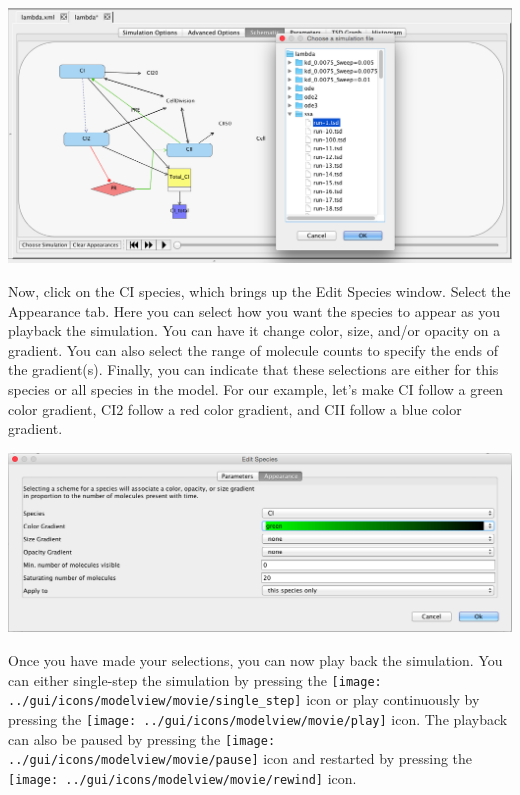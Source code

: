 \documentclass[titlepage,11pt]{article}
\begin{document}
\begin{center}
\includegraphics[width=160mm]{screenshots/chooseSim}
\end{center}

Now, click on the CI species, which brings up the Edit Species window.  Select the Appearance tab.  Here you can select how you want the species to appear as you playback the simulation.  You can have it change color, size, and/or opacity on a gradient.  You can also select the range of molecule counts to specify the ends of the gradient(s).  Finally, you can indicate that these selections are either for this species or all species in the model.  For our example, let's make CI follow a green color gradient, CI2 follow a red color gradient, and CII follow a blue color gradient.
\begin{center}
\includegraphics[width=160mm]{screenshots/editSpeciesAppearance}
\end{center}

Once you have made your selections, you can now play back the simulation.  You can either single-step the simulation by pressing the \texttt{[image: ../gui/icons/modelview/movie/single\_step]} icon or play continuously by pressing the \texttt{[image: ../gui/icons/modelview/movie/play]} icon.  The playback can also be paused by pressing the \texttt{[image: ../gui/icons/modelview/movie/pause]} icon and restarted by pressing the  \texttt{[image: ../gui/icons/modelview/movie/rewind]} icon. 
\end{document}

